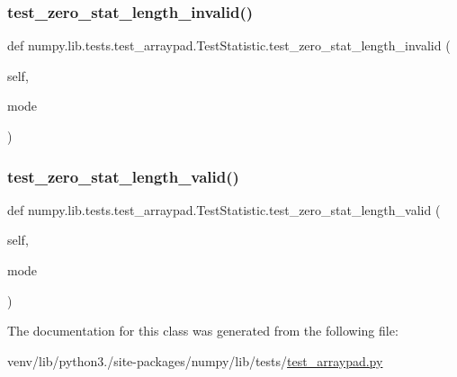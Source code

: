 \subsubsection{\texorpdfstring{test\+\_\+zero\+\_\+stat\+\_\+length\+\_\+invalid()}{test\_zero\_stat\_length\_invalid()}}
{\footnotesize\ttfamily def numpy.\+lib.\+tests.\+test\+\_\+arraypad.\+Test\+Statistic.\+test\+\_\+zero\+\_\+stat\+\_\+length\+\_\+invalid (\begin{DoxyParamCaption}\item[{}]{self,  }\item[{}]{mode }\end{DoxyParamCaption})}

\mbox{\label{classnumpy_1_1lib_1_1tests_1_1test__arraypad_1_1TestStatistic_afc39a4269f9a4539d7a661402d65ba32}} 
\subsubsection{\texorpdfstring{test\+\_\+zero\+\_\+stat\+\_\+length\+\_\+valid()}{test\_zero\_stat\_length\_valid()}}
{\footnotesize\ttfamily def numpy.\+lib.\+tests.\+test\+\_\+arraypad.\+Test\+Statistic.\+test\+\_\+zero\+\_\+stat\+\_\+length\+\_\+valid (\begin{DoxyParamCaption}\item[{}]{self,  }\item[{}]{mode }\end{DoxyParamCaption})}



The documentation for this class was generated from the following file\+:\begin{DoxyCompactItemize}
\item 
venv/lib/python3./site-\/packages/numpy/lib/tests/\hyperlink{test__arraypad_8py}{test\+\_\+arraypad.\+py}\end{DoxyCompactItemize}

